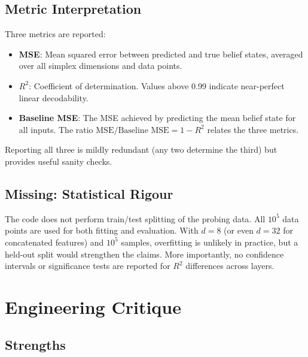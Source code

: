 \documentclass[11pt]{article}
\begin{document}
\subsection{Metric Interpretation}

Three metrics are reported:
\begin{itemize}
  \item \textbf{MSE}: Mean squared error between predicted and true belief states, averaged over all simplex dimensions and data points.
  \item \textbf{$R^2$}: Coefficient of determination.  Values above 0.99 indicate near-perfect linear decodability.
  \item \textbf{Baseline MSE}: The MSE achieved by predicting the mean belief state for all inputs.  The ratio $\text{MSE}/\text{Baseline MSE} = 1 - R^2$ relates the three metrics.
\end{itemize}

Reporting all three is mildly redundant (any two determine the third) but provides useful sanity checks.

\subsection{Missing: Statistical Rigour}

The code does not perform train/test splitting of the probing data.  All $10^5$ data points are used for both fitting and evaluation.  With $d = 8$ (or even $d = 32$ for concatenated features) and $10^5$ samples, overfitting is unlikely in practice, but a held-out split would strengthen the claims.  More importantly, no confidence intervals or significance tests are reported for $R^2$ differences across layers.

\section{Engineering Critique}

\subsection{Strengths}
\end{document}
